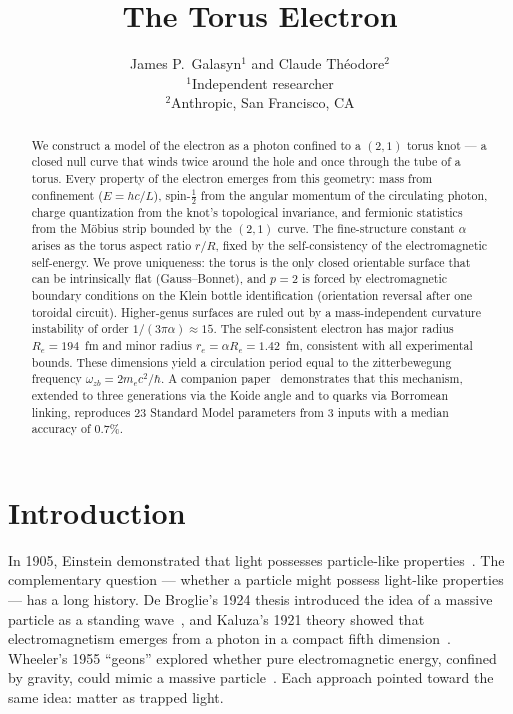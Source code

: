 \documentclass[11pt,a4paper]{article}
\title{\textbf{The Torus Electron}}
\author{
  James P.\ Galasyn$^{1}$ and Claude Th\'eodore$^{2}$ \\[6pt]
  \small $^{1}$Independent researcher \\
  \small $^{2}$Anthropic, San Francisco, CA
}
\date{}
\begin{document}
\maketitle

\begin{abstract}
We construct a model of the electron as a photon confined to a $(2,1)$ torus knot --- a closed null curve that winds twice around the hole and once through the tube of a torus. Every property of the electron emerges from this geometry: mass from confinement ($E = hc/L$), spin-$\tfrac{1}{2}$ from the angular momentum of the circulating photon, charge quantization from the knot's topological invariance, and fermionic statistics from the M\"obius strip bounded by the $(2,1)$ curve. The fine-structure constant $\alpha$ arises as the torus aspect ratio $r/R$, fixed by the self-consistency of the electromagnetic self-energy. We prove uniqueness: the torus is the only closed orientable surface that can be intrinsically flat (Gauss--Bonnet), and $p = 2$ is forced by electromagnetic boundary conditions on the Klein bottle identification (orientation reversal after one toroidal circuit). Higher-genus surfaces are ruled out by a mass-independent curvature instability of order $1/(3\pi\alpha) \approx 15$. The self-consistent electron has major radius $R_e = 194$~fm and minor radius $r_e = \alpha R_e = 1.42$~fm, consistent with all experimental bounds. These dimensions yield a circulation period equal to the zitterbewegung frequency $\omega_{zb} = 2m_e c^2/\hbar$. A companion paper~\cite{paper1} demonstrates that this mechanism, extended to three generations via the Koide angle and to quarks via Borromean linking, reproduces 23 Standard Model parameters from 3 inputs with a median accuracy of 0.7\%.
\end{abstract}

\section{Introduction}
\label{sec:intro}

In 1905, Einstein demonstrated that light possesses particle-like properties~\cite{einstein1905}. The complementary question --- whether a particle might possess light-like properties --- has a long history. De Broglie's 1924 thesis introduced the idea of a massive particle as a standing wave~\cite{debroglie1924}, and Kaluza's 1921 theory showed that electromagnetism emerges from a photon in a compact fifth dimension~\cite{kaluza1921}. Wheeler's 1955 ``geons'' explored whether pure electromagnetic energy, confined by gravity, could mimic a massive particle~\cite{wheeler1955,misner1957}. Each approach pointed toward the same idea: matter as trapped light.
\end{document}
